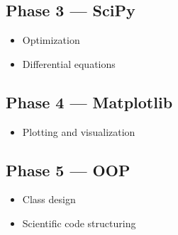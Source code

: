 \subsection*{Phase 3 --- SciPy}
\begin{itemize}
\item Optimization
\item Differential equations
\end{itemize}

\subsection*{Phase 4 --- Matplotlib}
\begin{itemize}
\item Plotting and visualization
\end{itemize}

\subsection*{Phase 5 --- OOP}
\begin{itemize}
\item Class design
\item Scientific code structuring
\end{itemize}